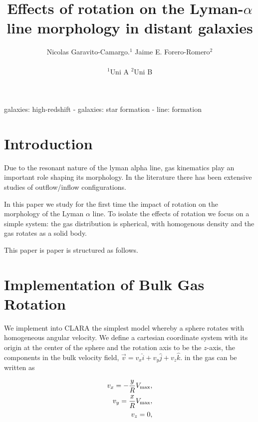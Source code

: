 \documentclass[usenatbib]{mn2e}
\begin{document}
\title[Rotation in the Lyman-$\alpha$ line]{Effects of rotation on the
  Lyman-$\alpha$ line morphology in distant galaxies}
\author[N. Garavito and J.E. Forero-Romero]{
\parbox[t]{\textwidth}{\raggedright 
  Nicolas Garavito-Camargo.$^{1}$ 
  Jaime E. Forero-Romero$^{2}$ 
}
\vspace*{6pt}\\
$^{1}$Uni A
$^{2}$Uni B
}
\maketitle

\begin{abstract}

\end{abstract}
\begin{keywords}
galaxies: high-redshift - galaxies: star formation - line: formation
\end{keywords}


\section{Introduction}
\label{sec:intro}

Due to the resonant nature of the lyman alpha line, gas kinematics
play an important role shaping its morphology. In the literature there
has been extensive studies of outflow/inflow configurations. 

In this paper we study for the first time the impact of rotation on
the morphology of the Lyman $\alpha$ line. To isolate the effects of
rotation we focus on a simple system: the gas distribution is
spherical, with homogenous density and the gas rotates as a solid
body.

This paper is paper is structured as follows.



\section{Implementation of Bulk Gas Rotation}
\label{sec:implementation}

We implement into CLARA the simplest model whereby a sphere rotates
with homogeneous angular velocity. We define a cartesian coordinate
system with its origin at the center of the sphere and the rotation
axis to be the $z$-axis, the components in the bulk velocity field, $\vec{v}
= v_{x}\hat{i} + v_{y}\hat{j} + v_{z}\hat{k}$. in the gas can be written as 
 
\begin{subequations}
\begin{align}
    v_{x}=-\dfrac{y}{R}V_{\rm max}, \label{subeq1}\\
    v_{y}=\dfrac{x}{R}V_{\rm max}, \label{subeq2}\\
    v_{z}=0, \label{subeq3}
\end{align}
\end{subequations}
\end{document}
